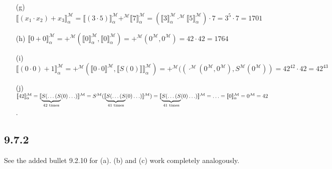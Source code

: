 \begin{enumerate}
\item[(g)] $\llbracket (x_1 \cdot x_2) +
  x_3\rrbracket_\alpha^\mathcal{M} = \llbracket(3 \cdot
  5)\rrbracket_\alpha^\mathcal{M} +^\mathcal{M}
  \llbracket7\rrbracket_\alpha^\mathcal{M} = (\llbracket
  3\rrbracket_\alpha^\mathcal{M} \cdot^\mathcal{M} \llbracket
  5\rrbracket_\alpha^\mathcal{M}) \cdot 7 = 3^5 \cdot 7 = 1701$

\item[(h)] $\llbracket
    0+0\rrbracket^\mathcal{M}_\alpha=+^\mathcal{M}(\llbracket
    0\rrbracket^\mathcal{M}_\alpha,\llbracket
    0\rrbracket^\mathcal{M}_\alpha)=+^\mathcal{M}(0^\mathcal{M},
    0^\mathcal{M})=42\cdot 42=1764$

\item[(i)] $\llbracket (0\cdot
  0)+1\rrbracket^\mathcal{M}_\alpha=+^\mathcal{M}(\llbracket 0\cdot
  0\rrbracket^\mathcal{M}, \llbracket
  S(0)\rrbracket\rrbracket^\mathcal{M}_\alpha)=+^\mathcal{M}((\cdot^\mathcal{M}(0^\mathcal{M},
  0^\mathcal{M}), S^\mathcal{M}(0^\mathcal{M}))=42^{42}\cdot
  42=42^{43}$

\item[(j)] $\llbracket
  42\rrbracket^\mathcal{M}_\alpha=\llbracket\underbrace{S(\mathellipsis(S}_{42\text{
      times}}(0)\mathellipsis)\rrbracket^\mathcal{M}=S^\mathcal{M}(\llbracket\underbrace{S(\mathellipsis(S}_{41\text{
      times}}(0)\mathellipsis)\rrbracket^\mathcal{M})=\llbracket\underbrace{S(\mathellipsis(S}_{41\text{
      times}}(0)\mathellipsis)\rrbracket^\mathcal{M}=\mathellipsis
    =\llbracket 0\rrbracket^\mathcal{M}_\alpha=0^\mathcal{M}=42$.

\end{enumerate}

\subsection*{9.7.2}

See the added bullet 9.2.10 for (a). (b) and (c) work completely analogously.

